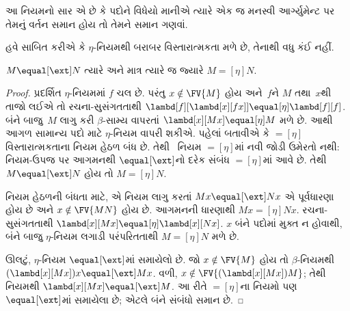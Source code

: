 \documentclass[../../../include/open-logic-section]{subfiles}
\begin{document}
આ નિયમનો સાર એ છે કે પદોને વિધેયો માનીએ ત્યારે એક જ
મનસ્વી આર્ગ્યુમેન્ટ પર તેમનું વર્તન સમાન હોય તો તેમને
સમાન ગણવાં.

હવે સાબિત કરીએ કે $\eta$-નિયમથી બરાબર વિસ્તારાત્મકતા
મળે છે, તેનાથી વધુ કંઈ નહીં.

\begin{thm}
  $M \equal[\ext] N$ ત્યારે અને માત્ર ત્યારે જ જ્યારે
  $M \equal[\eta] N$.
\end{thm}

\begin{proof}
  પ્રદર્શિત $\eta$-નિયમમાં $f$ ચલ છે. પરંતુ
  $x \notin \FV{M}$ હોય અને~$f$ને $M$ તથા~$x$થી
  તાજો લઈએ તો રચના-સુસંગતતાથી
  $\lambd[f][\lambd[x][f x]] \equal[\eta]
  \lambd[f][f]$. બંને બાજુ~$M$ લાગુ કરી
  $\beta$-સામ્ય વાપરતાં $\lambd[x][Mx]
  \equal[\eta] M$ મળે છે. આથી આગળ સામાન્ય પદો માટે
  $\eta$-નિયમ વાપરી શકીએ.
  પહેલાં બતાવીએ કે $\equal[\eta]$ વિસ્તારાત્મકતાના
  નિયમ હેઠળ બંધ છે. તેથી~\ext{} નિયમ
  $\equal[\eta]$માં નવી જોડી ઉમેરતો નથી: નિયમ-ઉપજ
  પર આગમનથી $\equal[\ext]$નો દરેક સંબંધ
  $\equal[\eta]$માં આવે છે. તેથી
  $M \equal[\ext] N$ હોય તો $M \equal[\eta] N$.

  \ext{} નિયમ હેઠળની બંધતા માટે, એ નિયમ લાગુ કરતાં
  $Mx \equal[\ext] Nx$ એ પૂર્વધારણા હોય છે અને
  $x \notin \FV{MN}$ હોય છે. આગમનની ધારણાથી
  $Mx \equal[\eta] Nx$. રચના-સુસંગતતાથી
  $\lambd[x][Mx] \equal[\eta] \lambd[x][Nx]$.
  $x$ બંને પદોમાં મુક્ત ન હોવાથી, બંને બાજુ
  $\eta$-નિયમ લગાડી પરંપરિતતાથી
  $M \equal[\eta] N$ મળે છે.

  ઊલટું, $\eta$-નિયમ $\equal[\ext]$માં સમાયેલો છે.
  જો $x \notin \FV{M}$ હોય તો $\beta$-નિયમથી
  $(\lambd[x][Mx])x \equal[\ext] Mx$. વળી,
  $x \notin \FV{(\lambd[x][Mx])M}$; તેથી
  \ext{} નિયમથી $\lambd[x][Mx] \equal[\ext] M$.
  આ રીતે
  $\equal[\eta]$ના નિયમો પણ $\equal[\ext]$માં
  સમાયેલા છે; એટલે બંને સંબંધો સમાન છે.
\end{proof}
\end{document}
